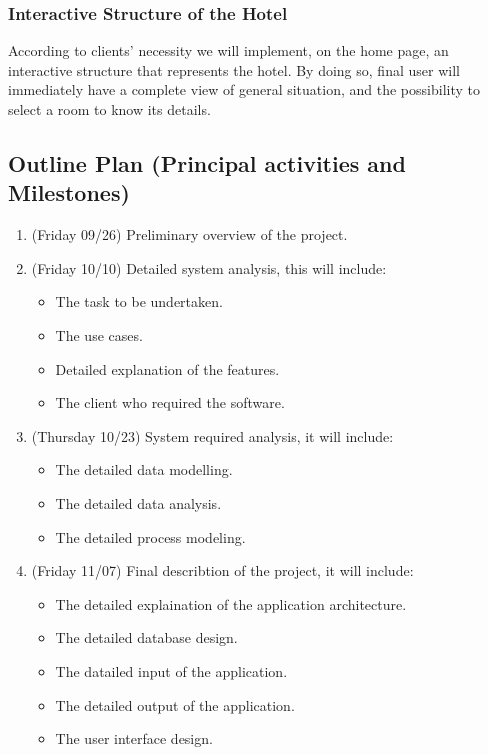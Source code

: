 \subsubsection{Interactive Structure of the Hotel}
	
According to clients’ necessity we will implement, on the home page, an interactive structure that represents the hotel. 
By doing so, final user will immediately have a complete view of general situation, and the possibility to select a room to know its details.

\subsection{Outline Plan (Principal activities and Milestones)}

\begin{enumerate}

\item (Friday 09/26) Preliminary overview of the project.

\item (Friday 10/10) Detailed system analysis, this will include:
	\begin{itemize}
		\item The task to be undertaken.
		\item The use cases.
		\item Detailed explanation of the features.
		\item The client who required the software.
	\end{itemize}

\item (Thursday 10/23) System required analysis, it will include:
  \begin{itemize}
    \item The detailed data modelling.
    \item The detailed data analysis.
    \item The detailed process modeling. 
  \end{itemize}

\item (Friday 11/07) Final describtion of the project, it will include:
  \begin{itemize}
    \item The detailed explaination of the application architecture.
    \item The detailed database design.
    \item The datailed input of the application.
    \item The detailed output of the application.
    \item The user interface design.
\end{itemize}

\end{enumerate}

